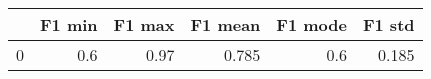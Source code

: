 \begin{tabular}{lrrrrr}
\toprule
{} &  F1 min &  F1 max &  F1 mean &  F1 mode &  F1 std \\
\midrule
0 &     0.6 &    0.97 &    0.785 &      0.6 &   0.185 \\
\bottomrule
\end{tabular}
